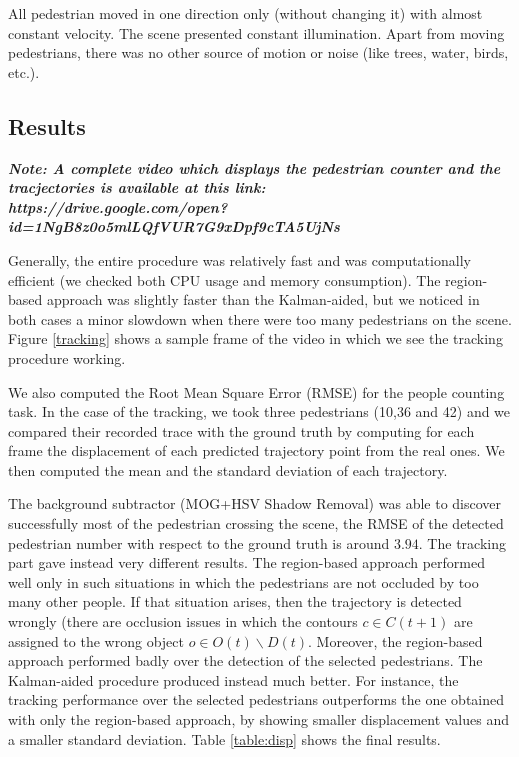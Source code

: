 \documentclass[runningheads]{llncs}
\begin{document}
All pedestrian moved in one direction only (without changing it) with almost constant velocity. The scene presented constant illumination. Apart from moving pedestrians, there was no other source of motion or noise (like trees, water, birds, etc.).

\subsection{Results}

\textit{\textbf{Note: A complete video which displays the pedestrian counter and the tracjectories is available at this link:\\ https://drive.google.com/open?id=1NgB8z0o5mlLQfVUR7G9xDpf9cTA5UjNs}}
\medskip

Generally, the entire procedure was relatively fast and was computationally efficient (we checked both CPU usage and memory consumption). The region-based approach was slightly faster than the Kalman-aided, but we noticed in both cases a minor slowdown when there were too many pedestrians on the scene. Figure \ref{tracking} shows a sample frame of the video in which we see the tracking procedure working.

We also computed the Root Mean Square Error (RMSE) for the people counting task. In the case of the tracking, we took three pedestrians (10,36 and 42) and we compared their recorded trace with the ground truth by computing for each frame the displacement of each predicted trajectory point from the real ones. We then computed the mean and the standard deviation of each trajectory.

The background subtractor (MOG+HSV Shadow Removal) was able to discover successfully most of the pedestrian crossing the scene, the RMSE of the detected pedestrian number with respect to the ground truth is around $3.94$. 
The tracking part gave instead very different results. The region-based approach performed well only in such situations in which the pedestrians are not occluded by too many other people. If that situation arises, then the trajectory is detected wrongly (there are occlusion issues in which the contours $c \in C(t+1)$ are assigned to the wrong object $o \in O(t)\backslash D(t)$. Moreover, the region-based approach performed badly over the detection of the selected pedestrians. 
The Kalman-aided procedure produced instead much better. For instance, the tracking performance over the selected pedestrians outperforms the one obtained with only the region-based approach, by showing smaller displacement values and a smaller standard deviation. Table \ref{table:disp} shows the final results.
\end{document}
